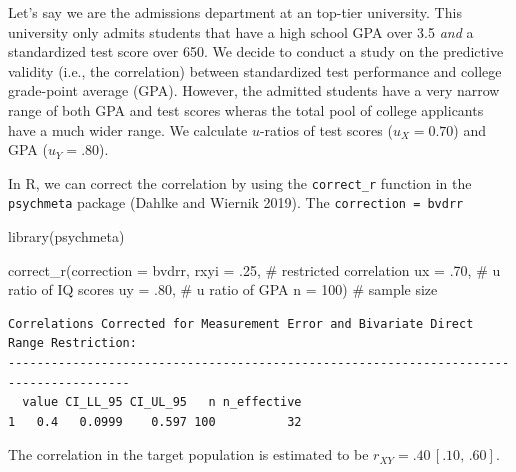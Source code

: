 \documentclass[
  letterpaper,
  DIV=11,
  numbers=noendperiod]{scrreprt}
\newenvironment{Shaded}{}{}
\newcommand{\AttributeTok}[1]{\textcolor[rgb]{0.00,0.34,0.68}{#1}}
\newcommand{\CommentTok}[1]{\textcolor[rgb]{0.54,0.53,0.53}{#1}}
\newcommand{\DecValTok}[1]{\textcolor[rgb]{0.69,0.50,0.00}{#1}}
\newcommand{\FunctionTok}[1]{\textcolor[rgb]{0.39,0.29,0.61}{#1}}
\newcommand{\NormalTok}[1]{\textcolor[rgb]{0.12,0.11,0.11}{#1}}
\newcommand{\StringTok}[1]{\textcolor[rgb]{0.75,0.01,0.01}{#1}}
\begin{document}
\begin{tcolorbox}[enhanced jigsaw, toptitle=1mm, titlerule=0mm, arc=.35mm, breakable, colframe=quarto-callout-note-color-frame, title={Applied Example in R}, opacitybacktitle=0.6, opacityback=0, colbacktitle=quarto-callout-note-color!10!white, coltitle=black, bottomtitle=1mm, colback=white, bottomrule=.15mm, rightrule=.15mm, toprule=.15mm, leftrule=.75mm, left=2mm]

Let's say we are the admissions department at an top-tier university.
This university only admits students that have a high school GPA over
3.5 \emph{and} a standardized test score over 650. We decide to conduct
a study on the predictive validity (i.e., the correlation) between
standardized test performance and college grade-point average (GPA).
However, the admitted students have a very narrow range of both GPA and
test scores wheras the total pool of college applicants have a much
wider range. We calculate \(u\)-ratios of test scores (\(u_{X}=0.70\))
and GPA (\(u_Y = .80\)).

In R, we can correct the correlation by using the \texttt{correct\_r}
function in the \texttt{psychmeta} package (Dahlke and Wiernik 2019).
The \texttt{correction\ =\ \textquotesingle{}bvdrr\textquotesingle{}}

\begin{Shaded}
\begin{Highlighting}[]
\FunctionTok{library}\NormalTok{(psychmeta)}

\FunctionTok{correct\_r}\NormalTok{(}\AttributeTok{correction =} \StringTok{\textquotesingle{}bvdrr\textquotesingle{}}\NormalTok{,}
          \AttributeTok{rxyi =}\NormalTok{ .}\DecValTok{25}\NormalTok{,  }\CommentTok{\# restricted correlation}
          \AttributeTok{ux =}\NormalTok{ .}\DecValTok{70}\NormalTok{,   }\CommentTok{\# u ratio of IQ scores}
          \AttributeTok{uy =}\NormalTok{ .}\DecValTok{80}\NormalTok{,   }\CommentTok{\# u ratio of GPA}
          \AttributeTok{n =} \DecValTok{100}\NormalTok{)    }\CommentTok{\# sample size}
\end{Highlighting}
\end{Shaded}

\begin{verbatim}
Correlations Corrected for Measurement Error and Bivariate Direct Range Restriction:
---------------------------------------------------------------------------------------
  value CI_LL_95 CI_UL_95   n n_effective
1   0.4   0.0999    0.597 100          32
\end{verbatim}

The correlation in the target population is estimated to be
\(r_{XY} = .40\, [.10,\, .60]\).

\end{tcolorbox}
\end{document}
